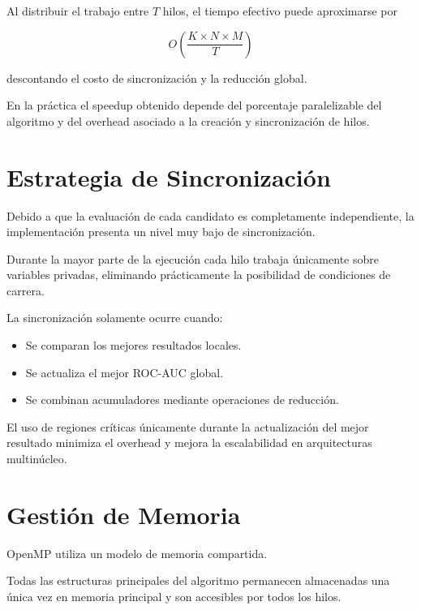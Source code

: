 Al distribuir el trabajo entre \(T\) hilos, el tiempo efectivo puede aproximarse por

\[
O\left(
\frac{K\times N\times M}{T}
\right)
\]

descontando el costo de sincronización y la reducción global.

En la práctica el speedup obtenido depende del porcentaje paralelizable del algoritmo y del overhead asociado a la creación y sincronización de hilos.


\section{Estrategia de Sincronización}

Debido a que la evaluación de cada candidato es completamente independiente, la implementación presenta un nivel muy bajo de sincronización.

Durante la mayor parte de la ejecución cada hilo trabaja únicamente sobre variables privadas, eliminando prácticamente la posibilidad de condiciones de carrera.

La sincronización solamente ocurre cuando:

\begin{itemize}

\item Se comparan los mejores resultados locales.

\item Se actualiza el mejor ROC-AUC global.

\item Se combinan acumuladores mediante operaciones de reducción.

\end{itemize}

El uso de regiones críticas únicamente durante la actualización del mejor resultado minimiza el overhead y mejora la escalabilidad en arquitecturas multinúcleo.


\section{Gestión de Memoria}

OpenMP utiliza un modelo de memoria compartida.

Todas las estructuras principales del algoritmo permanecen almacenadas una única vez en memoria principal y son accesibles por todos los hilos.

